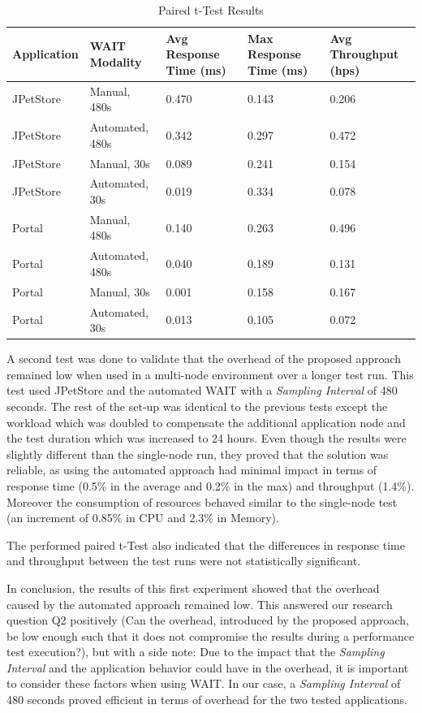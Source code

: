 \documentclass[runningheads,a4paper]{llncs}
\begin{document}
\begin{table}[!h]
\caption{Paired t-Test Results}
\label{tTest1}
\centering
\begin{tabular}{p{}|p{}|p{}|p{}|p{}}
\hline
\bfseries Application & \bfseries WAIT Modality & \bfseries Avg Response Time
(ms)& \bfseries Max Response Time (ms)& \bfseries Avg Throughput (hps)\\
\hline
JPetStore & 	Manual, 480s 			& 0.470 & 0.143	& 0.206\\
JPetStore & 	Automated, 480s 		& 0.342	& 0.297	& 0.472\\
JPetStore & 	Manual, 30s 			& 0.089	& 0.241	& 0.154\\
JPetStore & 	Automated, 30s 			& 0.019	& 0.334	& 0.078\\
\hline
Portal 	& 	Manual, 480s 			& 0.140 & 0.263	& 0.496\\
Portal 	& 	Automated, 480s 		& 0.040	& 0.189	& 0.131\\
Portal 	& 	Manual, 30s 			& 0.001	& 0.158	& 0.167\\
Portal 	& 	Automated, 30s 			& 0.013	& 0.105	& 0.072\\
\hline
\end{tabular}
\end{table}

A second test was done to validate that the overhead of the proposed approach
remained low when used in a multi-node environment over a longer test run.
This test used JPetStore and the automated WAIT with a \emph{Sampling Interval} of 480 seconds.
The rest of the set-up was identical to the previous tests except the workload
which was doubled to compensate the additional application node and the test
duration which was increased to 24 hours. Even though the results were slightly
different than the single-node run, they proved that the solution was reliable,
as using the automated approach had minimal impact in terms of response time
(0.5\% in the average and 0.2\% in the max) and throughput (1.4\%). Moreover the
consumption of resources behaved similar to the single-node test (an increment
of 0.85\% in CPU and 2.3\% in Memory).

The performed paired t-Test also indicated that the differences in response time
and throughput between the test runs were not statistically significant.

In conclusion, the results of this first experiment showed that the overhead
caused by the automated approach remained low. This answered our research
question Q2 positively (Can the overhead, introduced by the proposed approach, be low enough such that
it does not compromise the results during a performance test execution?), but
with a side note: Due to the impact that the \emph{Sampling Interval} and the
application behavior could have in the overhead, it is important to consider
these factors when using WAIT. In our case, a \emph{Sampling Interval} of 480
seconds proved efficient in terms of overhead for the two tested applications.
\end{document}
